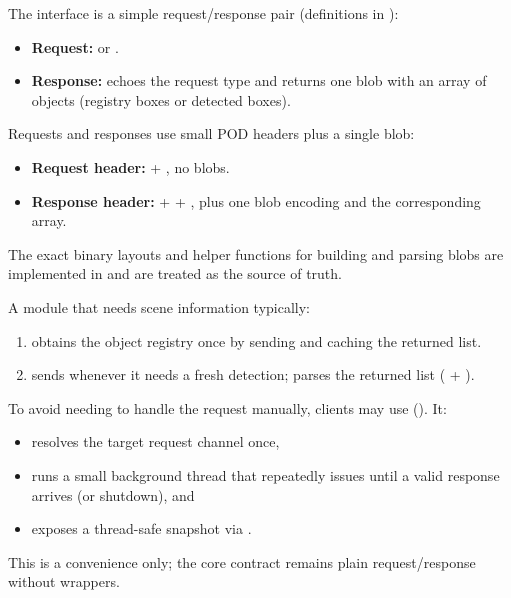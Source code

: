 The interface is a simple request/response pair (definitions in ):
\begin{itemize}
    \item \textbf{Request:}  or .
    \item \textbf{Response:} echoes the request type and returns one blob with an array of objects (registry boxes or detected boxes).
\end{itemize}

Requests and responses use small POD headers plus a single blob:
\begin{itemize}
    \item \textbf{Request header:}  + , no blobs.
    \item \textbf{Response header:}  +  + , plus one blob encoding  and the corresponding array.
\end{itemize}
The exact binary layouts and helper functions for building and parsing blobs are implemented in  and are treated as the source of truth.

A module that needs scene information typically:
\begin{enumerate}
    \item obtains the object registry once by sending  and caching the returned  list.
    \item sends  whenever it needs a fresh detection; parses the returned  list ( + ).
\end{enumerate}

To avoid needing to handle the  request manually, clients may use  (). It:
\begin{itemize}
    \item resolves the target request channel once,
    \item runs a small background thread that repeatedly issues  until a valid response arrives (or shutdown), and
    \item exposes a thread-safe snapshot via .
\end{itemize}
This is a convenience only; the core contract remains plain request/response without wrappers.

